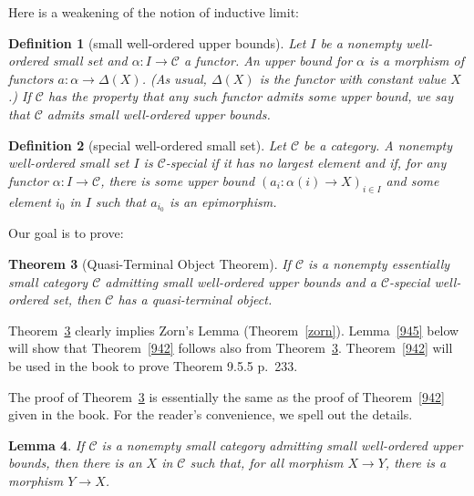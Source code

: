\documentclass[12pt]{article}
\newtheorem{thm}{Theorem}
\newtheorem{lem}[thm]{Lemma}
\newtheorem{df}[thm]{Definition}
\theoremstyle{remark}
\theoremstyle{definition}
\newcommand{\C}{\mathcal C}
\begin{document}
Here is a weakening of the notion of inductive limit:

\begin{df}[small well-ordered upper bounds] 
Let $I$ be a nonempty well-ordered small set and $\alpha:I\to\C$ a functor. An {\em upper bound} for $\alpha$ is a morphism of functors $a:\alpha\to\Delta(X)$. (As usual, $\Delta(X)$ is the functor with constant value $X$.) If $\C$ has the property that any such functor admits some upper bound, we say that $\C$ {\em admits small well-ordered upper bounds}. 
\end{df}

\begin{df}[special well-ordered small set] 
Let $\C$ be a category. A nonempty well-ordered small set $I$ is $\C$-{\em special} if it has no largest element and if, for any functor $\alpha:I\to\C$, there is some upper bound $(a_i:\alpha(i)\to X)_{i\in I}$ and some element $i_0$ in $I$ such that $a_{i_0}$ is an epimorphism. 
\end{df}

Our goal is to prove:

\begin{thm}[Quasi-Terminal Object Theorem]\label{qtot}
If $\C$ is a nonempty essentially small category $\C$ admitting small well-ordered upper bounds and a $\C$-special well-ordered set, then $\C$ has a quasi-terminal object.
\end{thm}

Theorem~\ref{qtot} clearly implies Zorn's Lemma (Theorem~\ref{zorn}). Lemma~\ref{945} below will show that Theorem~\ref{942} follows also from Theorem~\ref{qtot}. Theorem~\ref{942} will be used in the book to prove Theorem 9.5.5 p.~233.

The proof of Theorem~\ref{qtot} is essentially the same as the proof of Theorem~\ref{942} given in the book. For the reader's convenience, we spell out the details. 

\begin{lem}\label{943}
If $\C$ is a nonempty small category admitting small well-ordered upper bounds, then there is an $X$ in $\C$ such that, for all morphism $X\to Y$, there is a morphism $Y\to X$.
\end{lem}
\end{document}
